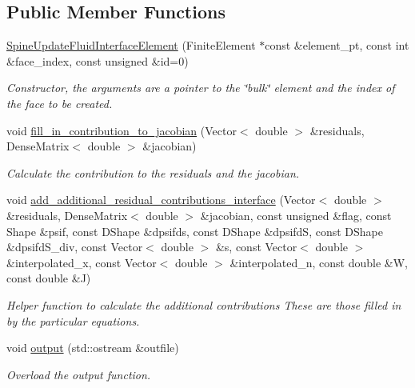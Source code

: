 \subsection*{Public Member Functions}
\begin{DoxyCompactItemize}
\item 
\hyperlink{classoomph_1_1SpineUpdateFluidInterfaceElement_a2cc44705997f9fb44abf56ddb5f0cde0}{Spine\+Update\+Fluid\+Interface\+Element} (Finite\+Element $\ast$const \&element\+\_\+pt, const int \&face\+\_\+index, const unsigned \&id=0)
\begin{DoxyCompactList}\small\item\em Constructor, the arguments are a pointer to the \char`\"{}bulk\char`\"{} element and the index of the face to be created. \end{DoxyCompactList}\item 
void \hyperlink{classoomph_1_1SpineUpdateFluidInterfaceElement_a457ca93343689e34535054cf829a9499}{fill\+\_\+in\+\_\+contribution\+\_\+to\+\_\+jacobian} (Vector$<$ double $>$ \&residuals, Dense\+Matrix$<$ double $>$ \&jacobian)
\begin{DoxyCompactList}\small\item\em Calculate the contribution to the residuals and the jacobian. \end{DoxyCompactList}\item 
void \hyperlink{classoomph_1_1SpineUpdateFluidInterfaceElement_a3958845051cafecd8e73745fc04c7a78}{add\+\_\+additional\+\_\+residual\+\_\+contributions\+\_\+interface} (Vector$<$ double $>$ \&residuals, Dense\+Matrix$<$ double $>$ \&jacobian, const unsigned \&flag, const Shape \&psif, const D\+Shape \&dpsifds, const D\+Shape \&dpsifdS, const D\+Shape \&dpsifd\+S\+\_\+div, const Vector$<$ double $>$ \&s, const Vector$<$ double $>$ \&interpolated\+\_\+x, const Vector$<$ double $>$ \&interpolated\+\_\+n, const double \&W, const double \&J)
\begin{DoxyCompactList}\small\item\em Helper function to calculate the additional contributions These are those filled in by the particular equations. \end{DoxyCompactList}\item 
void \hyperlink{classoomph_1_1SpineUpdateFluidInterfaceElement_ae2875e70d1f8eacc229ea3d4318f7de4}{output} (std\+::ostream \&outfile)
\begin{DoxyCompactList}\small\item\em Overload the output function. \end{DoxyCompactList}\item 

\end{DoxyCompactItemize}
